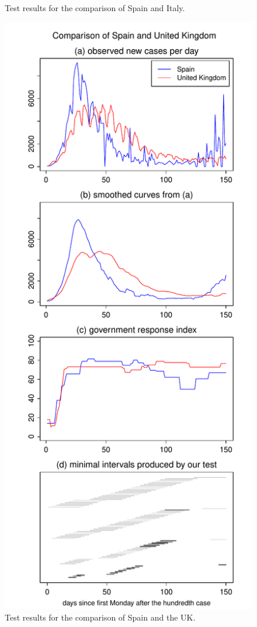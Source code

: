 \documentclass[a4paper,12pt]{article}
\numberwithin{equation}{section}
\begin{document}
\begin{figure}[h!]
\begin{minipage}[t]{0.49\textwidth}
\caption{Test results for the comparison of Spain and Italy.}
\end{minipage}
\hspace{0.25cm}
\begin{minipage}[t]{0.49\textwidth}
\includegraphics[width=\textwidth]{plots/ESP_vs_GBR_Monday}
\caption{Test results for the comparison of Spain and the UK.}
\end{minipage}
\end{figure}
\end{document}
